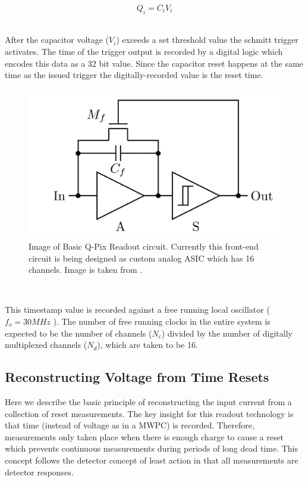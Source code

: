 \begin{equation}
Q_{i} = C_{i}V_{i}
\end{equation}
~\label{eq:capacitor}

After the capacitor voltage ($V_{i}$) exceeds a set threshold value the schmitt trigger activates.
The time of the trigger output is recorded by a digital logic which encodes this data as a 32 bit value.
Since the capacitor reset happens at the same time as the issued trigger the digitally-recorded value is the reset time.

\begin{figure}[]
\centering
\includegraphics[width=\textwidth]{images/qpix_circuit.jpg}
\caption{Image of Basic Q-Pix Readout circuit. Currently this front-end circuit is being designed as custom analog ASIC which has 16 channels. Image is taken from \citep{qpix:nygren:mei}.}
\end{figure}
~\label{fig:qpixCircuit}

This timestamp value is recorded against a free running local oscillator ($f_{o} = 30\unit{MHz}$ ).
The number of free running clocks in the entire system is expected to be the number of channels ($N_{c}$) divided by the number of digitally multiplexed channels ($N_{d}$), which are taken to be 16.


\subsection{Reconstructing Voltage from Time Resets}

Here we describe the basic principle of reconstructing the input current from a collection of reset measurements.
The key insight for this readout technology is that time (instead of voltage as in a MWPC) is recorded.
Therefore, measurements only taken place when there is enough charge to cause a reset which prevents continuous measurements during periods of long dead time.
This concept follows the detector concept of least action in that all measurements are detector responses.

